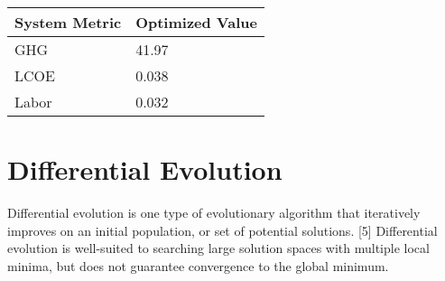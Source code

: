 \documentclass[letterpaper,10pt,english]{sphinxmanual}
\begin{document}
\begin{savenotes}\sphinxattablestart
\centering
\begin{tabulary}{\linewidth}[t]{|T|T|}
\hline
\sphinxstyletheadfamily 
System Metric
&\sphinxstyletheadfamily 
Optimized Value
\\
\hline
GHG
&
41.97
\\
\hline
LCOE
&
0.038
\\
\hline
Labor
&
0.032
\\
\hline
\end{tabulary}
\par
\sphinxattableend\end{savenotes}


\section{Differential Evolution}
\label{\detokenize{doc-src/optimizers:differential-evolution}}
Differential evolution is one type of evolutionary algorithm that
iteratively improves on an initial population, or set of potential
solutions. {[}5{]} Differential evolution is well-suited to searching large
solution spaces with multiple local minima, but does not guarantee
convergence to the global minimum.

\end{document}
